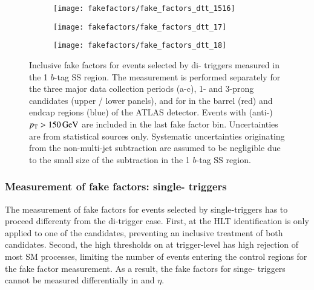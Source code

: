 \begin{figure}[htbp]
  \centering

  \begin{subfigure}{0.495\textwidth}
    \texttt{[image: fakefactors/fake\_factors\_dtt\_1516]}
  \end{subfigure}
  \begin{subfigure}{0.495\textwidth}
    \texttt{[image: fakefactors/fake\_factors\_dtt\_17]}
  \end{subfigure}

  \begin{subfigure}{0.495\textwidth}
    \texttt{[image: fakefactors/fake\_factors\_dtt\_18]}
  \end{subfigure}

  \caption{Inclusive fake factors for events selected by di-\tauhadvis
    triggers measured in the 1 $b$-tag SS region. The measurement is
    performed separately for the three major data collection periods
    (a-c), 1- and 3-prong \tauhadvis candidates (upper / lower
    panels), and for \tauhadvis in the barrel (red) and endcap regions
    (blue) of the ATLAS detector. Events with (anti-)\tauhadvis
    $p_{\text{T}} > \SI{150}{\ensuremath{\text{GeV}}}$ are included in the last fake factor
    bin. Uncertainties are from statistical sources only. Systematic
    uncertainties originating from the non-multi-jet subtraction are
    assumed to be negligible due to the small size of the subtraction
    in the 1 $b$-tag SS region.}
  \label{fig:mjfakes_fake_factors}
\end{figure}


\subsubsection{Measurement of fake factors: single-\tauhadvis
  triggers}

The measurement of fake factors for events selected by
single-\tauhadvis triggers has to proceed differenty from the
di-\tauhadvis trigger case. First, at the HLT \tauhadvis
identification is only applied to one of the \tauhadvis candidates,
preventing an inclusive treatment of both \tauhadvis
candidates. Second, the high \pT thresholds on \tauhadvis at
trigger-level has high rejection of most SM processes, limiting the
number of events entering the control regions for the fake factor
measurement. As a result, the fake factors for singe-\tauhadvis
triggers cannot be measured differentially in \tauhadvis \pT and
$\eta$.

